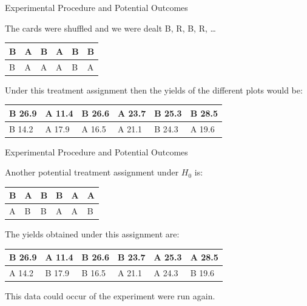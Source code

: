 \documentclass[10pt,ignorenonframetext,]{beamer}
\begin{document}
\begin{frame}{Experimental Procedure and Potential Outcomes}

The cards were shuffled and we were dealt B, R, B, R, \ldots{}

\begin{table}[]
\centering
\label{my-label}
\begin{tabular}{|l|l|l|l|l|l|}
\hline
B  & A  & B  & A  & B   & B  \\ \hline
B  & A  & A  & A  & B  & A  \\ \hline
\end{tabular}
\end{table}

Under this treatment assignment then the yields of the different plots
would be:

\begin{table}[]
\centering
\label{my-label}
\begin{tabular}{|l|l|l|l|l|l|}
\hline
B 26.9 & A 11.4 & B 26.6 & A 23.7 & B 25.3  & B 28.5 \\ \hline
B 14.2 & A 17.9 & A 16.5 & A 21.1 & B 24.3 & A 19.6 \\ \hline
\end{tabular}
\end{table}

\end{frame}

\begin{frame}{Experimental Procedure and Potential Outcomes}

Another potential treatment assignment under \(H_0\) is:

\begin{table}[]
\centering
\label{my-label}
\begin{tabular}{|l|l|l|l|l|l|}
\hline
B  & A  & B  & B  & A   & A  \\ \hline
A  & B  & B  & A  & A  & B  \\ \hline
\end{tabular}
\end{table}

The yields obtained under this assignment are:

\begin{table}[]
\centering
\label{my-label}
\begin{tabular}{|l|l|l|l|l|l|}
\hline
B 26.9 & A 11.4 & B 26.6 & B 23.7 & A 25.3  & A 28.5 \\ \hline
A 14.2 & B 17.9 & B 16.5 & A 21.1 & A 24.3 & B 19.6 \\ \hline
\end{tabular}
\end{table}

This data could occur of the experiment were run again.

\end{frame}
\end{document}
